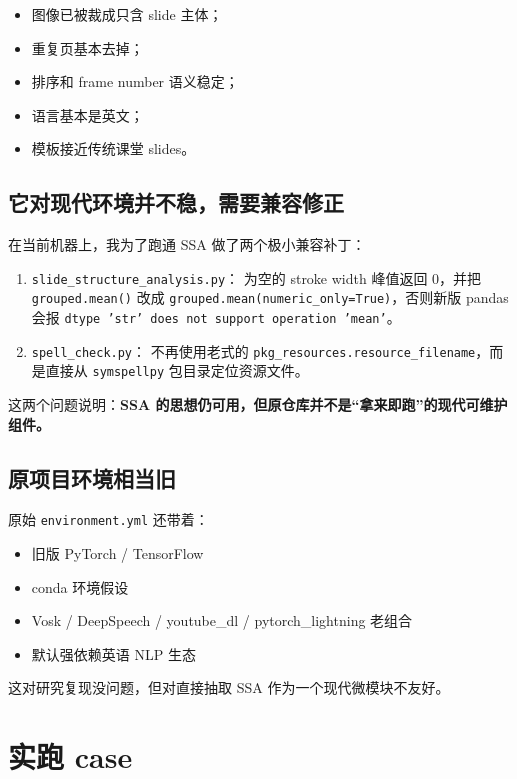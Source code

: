 \documentclass[a4paper]{article}
\begin{document}
\begin{itemize}
\item 图像已被裁成只含 slide 主体；
\item 重复页基本去掉；
\item 排序和 frame number 语义稳定；
\item 语言基本是英文；
\item 模板接近传统课堂 slides。
\end{itemize}

\subsection{它对现代环境并不稳，需要兼容修正}

在当前机器上，我为了跑通 SSA 做了两个极小兼容补丁：

\begin{enumerate}
\item \texttt{slide\_structure\_analysis.py}：
  为空的 stroke width 峰值返回 0，并把 \texttt{grouped.mean()} 改成 \texttt{grouped.mean(numeric\_only=True)}，否则新版 pandas 会报 \texttt{dtype 'str' does not support operation 'mean'}。
\item \texttt{spell\_check.py}：
  不再使用老式的 \texttt{pkg\_resources.resource\_filename}，而是直接从 \texttt{symspellpy} 包目录定位资源文件。
\end{enumerate}

这两个问题说明：\textbf{SSA 的思想仍可用，但原仓库并不是“拿来即跑”的现代可维护组件。}

\subsection{原项目环境相当旧}

原始 \texttt{environment.yml} 还带着：

\begin{itemize}
\item 旧版 PyTorch / TensorFlow
\item conda 环境假设
\item Vosk / DeepSpeech / youtube\_dl / pytorch\_lightning 老组合
\item 默认强依赖英语 NLP 生态
\end{itemize}

这对研究复现没问题，但对直接抽取 SSA 作为一个现代微模块不友好。

\section{实跑 case}
\end{document}
